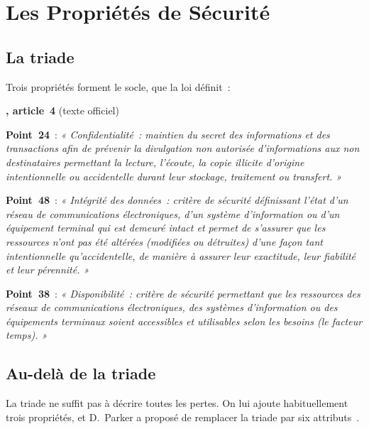 \section{Les Propriétés de Sécurité}
\label{sec:c01-proprietes}

\subsection{La triade}

Trois propriétés forment le socle, que la loi définit~:

\begin{boxjuris}
\textbf{, article~4} (texte officiel)

\medskip
\textbf{Point~24}~: \textit{« Confidentialité~: maintien du secret des
informations et des transactions afin de prévenir la divulgation non
autorisée d'informations aux non destinataires permettant la lecture,
l'écoute, la copie illicite d'origine intentionnelle ou accidentelle durant
leur stockage, traitement ou transfert. »}

\medskip
\textbf{Point~48}~: \textit{« Intégrité des données~: critère de sécurité
définissant l'état d'un réseau de communications électroniques, d'un
système d'information ou d'un équipement terminal qui est demeuré intact et
permet de s'assurer que les ressources n'ont pas été altérées (modifiées ou
détruites) d'une façon tant intentionnelle qu'accidentelle, de manière à
assurer leur exactitude, leur fiabilité et leur pérennité. »}

\medskip
\textbf{Point~38}~: \textit{« Disponibilité~: critère de sécurité
permettant que les ressources des réseaux de communications électroniques,
des systèmes d'information ou des équipements terminaux soient accessibles
et utilisables selon les besoins (le facteur temps). »}
\end{boxjuris}

\subsection{Au-delà de la triade}

La triade ne suffit pas à décrire toutes les pertes. On lui ajoute
habituellement trois propriétés, et D.~Parker a proposé de remplacer la
triade par six attributs~\cite{parker1998}.

